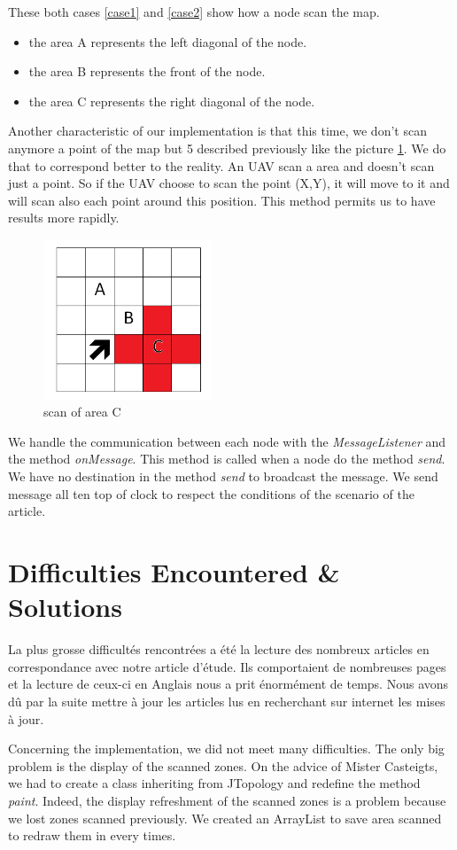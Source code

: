 These both cases \ref{case1} and \ref{case2} show how a node scan the map.

\begin{itemize}
\item the area A represents the left diagonal of the node.
\item the area B represents the front of the node.
\item the area C represents the right diagonal of the node.
\end{itemize}

Another characteristic of our implementation is that this time, we don't scan anymore a point of the map but 5 described previously  like the picture \ref{scanofarea}. We do that to correspond better to the reality. An UAV scan a area and doesn't scan just a point. So if the UAV choose to scan the point (X,Y), it will move to it and will scan also each point around this position. This method permits us to have results more rapidly.

\begin{figure}[!h]
\center
\includegraphics[width=5cm]{../images/grille_case_2_scan.png}
\caption{\label{scanofarea}scan of area C}
\end{figure}

We handle the communication between each node with the \textit{MessageListener} and the method \textit{onMessage}. This method is called when a node do the method \textit{send}. We have no destination in the method \textit{send} to broadcast the message. We send message all ten top of clock to respect the conditions of the scenario of the article.

\section{Difficulties Encountered \& Solutions}

La plus grosse difficultés rencontrées a été la lecture des nombreux articles en correspondance avec notre article d'étude. Ils comportaient de nombreuses pages et la lecture de ceux-ci en Anglais nous a prit énormément de temps. Nous avons dû par la suite mettre à jour les articles lus en recherchant sur internet les mises à jour.

Concerning the implementation, we did not meet many difficulties. The only big problem is the display of the scanned zones. On the advice of Mister Casteigts, we had to create a class inheriting from JTopology and redefine the method \textit{paint}. Indeed, the display refreshment of the scanned zones is a problem because we lost zones scanned previously. We created an ArrayList to save area scanned to redraw them in every times.